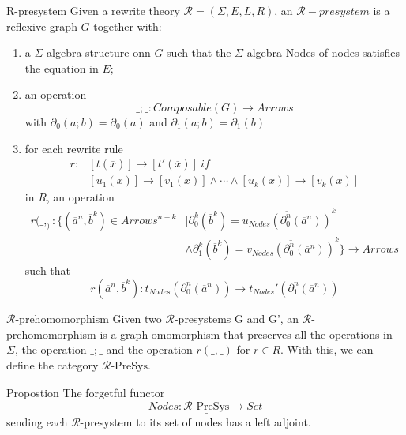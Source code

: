 \documentclass{beamer}
\begin{document}
\begin{frame}
    \scriptsize
    \begin{block}{R-presystem}
        Given a rewrite theory $\mathcal{R} = (\Sigma, E, L, R)$, an $\mathcal{R}-presystem$
        is a reflexive graph $G$ together with: \begin{enumerate}
            \item a $\Sigma$-algebra structure onn $G$ such that the $\Sigma$-algebra Nodes of nodes
            satisfies the equation in $E$;
            \item an operation 
            $$ \_;\_ : Composable(G) \rightarrow Arrows$$
            with $\partial_0(a;b) = \partial_0(a)$ and $\partial_1(a;b) = \partial_1(b)$
            \item for each rewrite rule 
            \begin{align*}
                r:&[t(\overline{x})] \rightarrow [t'(\overline{x})]\ if \\ 
                &[u_1(\overline{x})] \rightarrow [v_1(\overline{x})] \wedge \cdots \wedge [u_k(\overline{x})] \rightarrow [v_k(\overline{x})] 
            \end{align*}
            in $R$, an operation  
            \begin{align*}
                r(\_,_) : \{(\overline{a}^n,\overline{b}^k) \in Arrows^{n+k}& 
                | \partial_0^k(\overline{b}^k) = \overline{u_{Nodes}(\partial_0^n(\overline{a}^n))}^k \\
                &\wedge  \partial_1^k(\overline{b}^k) = \overline{v_{Nodes}(\partial_0^n(\overline{a}^n))}^k\} \rightarrow Arrows
            \end{align*}
        such that $$ r(\overline{a}^n,\overline{b}^k) : t_{Nodes}(\partial_0^n(\overline{a}^n)) \rightarrow t_{Nodes}'(\partial_1^n(\overline{a}^n))$$
        \end{enumerate}
    \end{block}
\end{frame}
\begin{frame}
    \small
    \begin{block}{$\mathcal{R}$-prehomomorphism}
        Given two $\mathcal{R}$-presystems G and G', an $\mathcal{R}$-prehomomorphism is a 
        graph omomorphism that preserves all the operations in $\Sigma$, the operation $\_;\_$ and the operation $r(\_,\_)$ for $r \in R$.
        With this, we can define the category $\underline{\mathcal{R}\text{-PreSys}}$.
    \end{block}
    
    \pause
    \begin{block}{Propostion}
        The forgetful functor 
        $$Nodes: \underline{\mathcal{R}\text{-PreSys}} \rightarrow \underline{Set}$$
        sending each $\mathcal{R}$-presystem to its set of nodes has a left adjoint.
    \end{block}
\end{frame}
\end{document}
